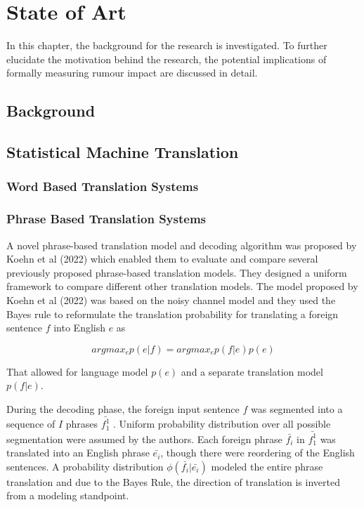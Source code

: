 \chapter{State of Art}
In this chapter, the background for the research is investigated. To further elucidate the motivation behind the research, the potential implications of formally measuring rumour impact are discussed in detail.

\section{Background}

\section{Statistical Machine Translation}
\subsection{Word Based Translation Systems}
\subsection{Phrase Based Translation Systems}
A novel phrase-based translation model and decoding algorithm was proposed by Koehn et al (2022) which enabled them to evaluate and compare several previously proposed phrase-based translation models. They designed a uniform framework to compare different other translation models. The model proposed by Koehn et al (2022) was based on the noisy channel model and they used the Bayes rule to reformulate the translation probability for translating a foreign sentence $f$ into English $e$ as

$$
argmax_ep(e|f)= argmax_ep(f|e)p(e)
$$

That allowed for language model $p(e)$ and a separate translation model $p(f|e)$.

During the decoding phase, the foreign input sentence $f$ was segmented into a sequence of $I$ phrases $\bar{f_1^1}$ . Uniform probability distribution over all possible segmentation were assumed by the authors. Each foreign phrase $\bar{f_i}$ in $\bar{f_1^1}$ was translated into an English phrase $\bar{e_i}$, though there were reordering of the English sentences. A probability distribution $\phi(\bar{f_i}|\bar{e_i})$ modeled the entire phrase translation and due to the Bayes Rule, the direction of translation is inverted from a modeling standpoint. 

